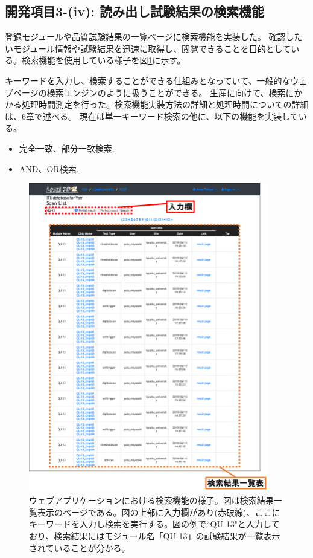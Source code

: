\subsection{開発項目3-(iv): 読み出し試験結果の検索機能}\label{sec:searching_tool}
登録モジュールや品質試験結果の一覧ページに検索機能を実装した。
確認したいモジュール情報や試験結果を迅速に取得し、閲覧できることを目的としている。検索機能を使用している様子を図\ref{webapp_search_function}に示す。

キーワードを入力し、検索することができる仕組みとなっていて、一般的なウェブページの検索エンジンのように扱うことができる。
生産に向けて、検索にかかる処理時間測定を行った。検索機能実装方法の詳細と処理時間についての詳細は、6章で述べる。
現在は単一キーワード検索の他に、以下の機能を実装している。
\begin{itemize}
  \item 完全一致、部分一致検索.
  \item AND、OR検索.
\end{itemize}

\begin{figure}[bpt]\centering
\includegraphics[width=10.5cm]{./webapp_search_function.png}
\caption[ウェブアプリケーションにおける検索機能の様子]{ウェブアプリケーションにおける検索機能の様子。図は検索結果一覧表示のページである。図の上部に入力欄があり(赤破線)、ここにキーワードを入力し検索を実行する。図の例で``QU-13"と入力しており、検索結果にはモジュール名「QU-13」の試験結果が一覧表示されていることが分かる。}
\label{webapp_search_function}
\end{figure}


